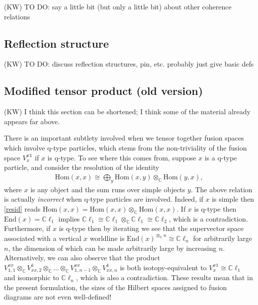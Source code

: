 \documentclass[12pt,a4paper]{article}
\newcommand{\tp}{\otimes}
\newcommand{\unit}{\mathds{1}}
\newcommand{\cc}{\mathbb{C}}
\newcommand{\Hom}{\text{Hom}}
\newcommand{\End}{\text{End}}
\newcommand{\cl}{\mathbb{C}\ell}
\newcommand{\kw}[1]{{\color{kwcolor}\footnotesize{(KW) #1}}}
\begin{document}
\kw{TO DO: say a little bit (but only a little bit) about other coherence relations}





\subsection{Reflection structure} \label{reflection_ss}

\kw{TO DO: discuss reflection structures, pin, etc.
probably just give basic defs}



\subsection{Modified tensor product (old version)}

\kw{I think this section can be shortened; I think some of the material already appears far above.}

There is an important subtlety involved when we tensor together fusion spaces which involve q-type particles, which stems from the non-triviality of the fusion space $V^{x\unit}_x$ if $x$ is q-type.
To see where this comes from, suppose $x$ is a q-type particle, and consider the resolution of the identity 
\begin{align} \label{resid}
\Hom(x,x) \cong \bigoplus_y \Hom(x,y) \tp_\cc \Hom(y,x),
\end{align}
where $x$ is any object and the sum runs over simple objects $y$. 
The above relation is actually {\it incorrect} when q-type particles are involved. 
Indeed, if $x$ is simple then \eqref{resid} reads $\Hom(x,x) = \Hom(x,x) \tp_\cc \Hom(x,x).$ 
If $x$ is q-type then $\End(x) = \cl_1$ implies $\cl_1 \cong \cl_1\tp_\cc \cl_1 \cong \cl_2$, which is a contradiction. 
Furthermore, if $x$ is q-type then by iterating we see that the supervector space associated with a vertical $x$ worldline is $\End(x)^{\tp_{\cc} n} \cong \cl_n$ for arbitrarily large $n$, the dimension of which can be made arbitrarily large by increasing $n$. 
Alternatively, we can also observe that the product $V_{\unit,1}^{xx} \tp_\cc V^\unit_{xx,2} \tp_\cc \dots \tp_\cc V_{\unit,n-1}^{xx} \tp_\cc V^\unit_{xx,n}$ is both isotopy-equivalent to $V^{x\unit}_x \cong \cl_1$ and isomorphic to $\cl_n$, which is also a contradiction. 
These results mean that in the present formulation, the sizes of the Hilbert spaces assigned to fusion diagrams are not even well-defined! 
\end{document}
